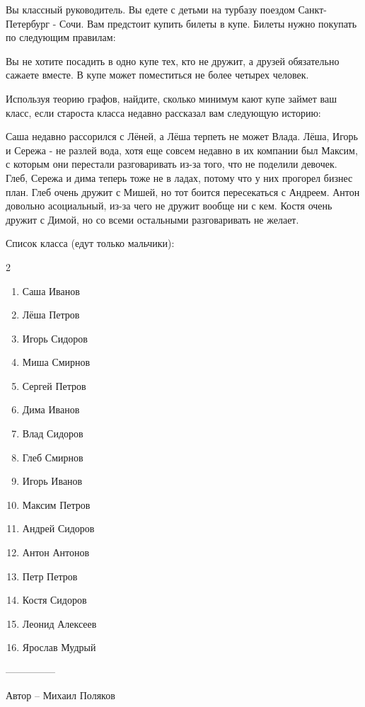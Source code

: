 \question
Вы классный руководитель. Вы едете с детьми на турбазу поездом Санкт-Петербург - Сочи. Вам предстоит купить билеты в купе. Билеты нужно покупать по следующим правилам:

Вы не хотите посадить в одно купе тех, кто не дружит, а друзей обязательно сажаете вместе. В купе может поместиться не более четырех человек.

Используя теорию графов, найдите, сколько минимум кают купе займет ваш класс, если староста класса недавно рассказал вам следующую историю:

Саша недавно рассорился с Лёней, а Лёша терпеть не может Влада. Лёша, Игорь и Сережа - не разлей вода, хотя еще совсем недавно в их компании был Максим, с которым они перестали разговаривать из-за того, что не поделили девочек. Глеб, Сережа и дима теперь тоже не в ладах, потому что у них прогорел бизнес план. Глеб очень дружит с Мишей, но тот боится пересекаться с Андреем. Антон довольно асоциальный, из-за чего не дружит вообще ни с кем. Костя очень дружит с Димой, но со всеми остальными разговаривать не желает.

Список класса (едут только мальчики):

\begin{multicols}{2}
\begin{enumerate}
\item Саша Иванов
\item Лёша Петров
\item Игорь Сидоров
\item Миша Смирнов
\item Сергей Петров
\item Дима Иванов
\item Влад Сидоров
\item Глеб Смирнов
\item Игорь Иванов
\item Максим Петров
\item Андрей Сидоров
\item Антон Антонов
\item Петр Петров
\item Костя Сидоров
\item Леонид Алексеев
\item Ярослав Мудрый
\end{enumerate}
\end{multicols}

---------------

Автор -- Михаил Поляков
